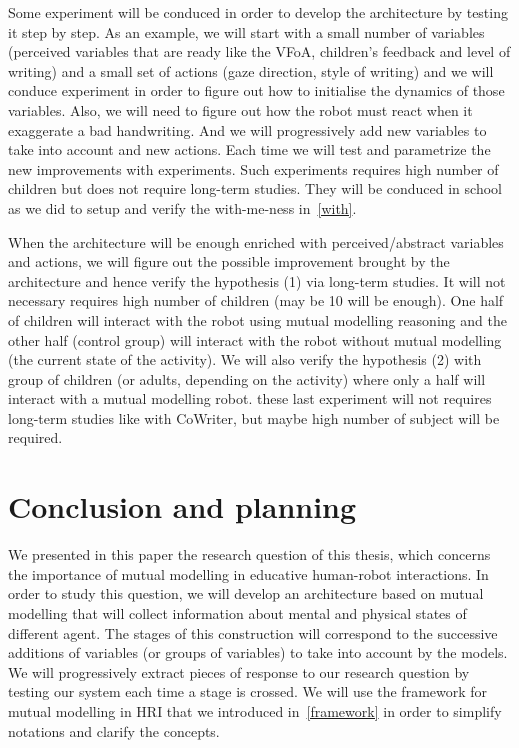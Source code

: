 \documentclass[10pt,a4paper]{article}
\begin{document}
Some experiment will be conduced in order to develop the architecture by testing it step by step. As an example, we will start with a small number of variables (perceived variables that are ready like the VFoA, children's feedback and level of writing) and a small set of actions (gaze direction, style of writing) and we will conduce experiment in order to figure out how to initialise the dynamics of those variables. Also, we will need to figure out how the robot must react when it exaggerate a bad handwriting. And we will progressively add new variables to take into account and new actions. Each time we will test and parametrize the new improvements with experiments. Such experiments requires high number of children but does not require long-term studies. They will be conduced in school as we did to setup and verify the with-me-ness in~\ref{with}.

When the architecture will be enough enriched with perceived/abstract variables and actions, we will figure out the possible improvement brought by the architecture and hence verify the hypothesis (1) via long-term studies. It will not necessary requires high number of children (may be 10 will be enough). One half of children will interact with the robot using mutual modelling reasoning and the other half (control group) will interact with the robot without mutual modelling (the current state of the activity). We will also verify the hypothesis (2) with group of children (or adults, depending on the activity) where only a half will interact with a mutual modelling robot. these last experiment will not requires long-term studies like with CoWriter, but maybe high number of subject will be required.

\section{Conclusion and planning}

We presented in this paper the research question of this thesis, which concerns the importance of mutual modelling in educative human-robot interactions. In order to study this question, we will develop an architecture based on mutual modelling that will collect information about mental and physical states of different agent. The stages of this construction will correspond to the successive additions of variables (or groups of variables) to take into account by the models. We will progressively extract pieces of response to our research question by testing our system each time a stage is crossed. We will use the framework for mutual modelling in HRI that we introduced in~\ref{framework} in order to simplify notations and clarify the concepts. 


\small
 
\end{document}
